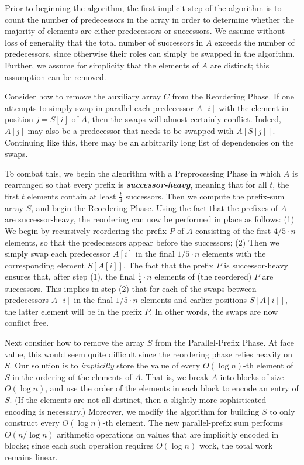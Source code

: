 \documentclass[sigconf, 10pt, nonacm]{acmart}
\newcommand{\defn}[1]{{\textit{\textbf{\boldmath #1}}}}
\renewcommand{\paragraph}[1]{\vspace{0.09in}\noindent{\bf \boldmath #1.}}
\theoremstyle{remark}
\theoremstyle{remark}
\begin{document}
\paragraph{Algorithm Outline}
Prior to beginning the algorithm, the first implicit step of the
algorithm is to count the number of predecessors in the array in
order to determine whether the majority of elements are either
predecessors or successors. We assume without loss of generality that the total
number of successors in $A$ exceeds the number of predecessors, since otherwise
their roles can simply be swapped in the algorithm. Further, we assume for
simplicity that the elements of $A$ are distinct; this assumption can be removed.

Consider how to remove the auxiliary array $C$ from the Reordering
Phase. If one attempts to simply swap in parallel each predecessor
$A[i]$ with the element in position $j = S[i]$ of $A$, then the swaps
will almost certainly conflict. Indeed, $A[j]$ may also be a
predecessor that needs to be swapped with $A[S[j]]$. Continuing like
this, there may be an arbitrarily long list of dependencies on the
swaps.

To combat this, we begin the algorithm with a Preprocessing Phase in
which $A$ is rearranged so that every prefix is
\defn{successor-heavy}, meaning that for all $t$, the first $t$
elements contain at least $\frac{t}{4}$ successors. Then we compute
the prefix-sum array $S$, and begin the Reordering Phase. Using the
fact that the prefixes of $A$ are successor-heavy, the reordering can
now be performed in place as follows: (1) We begin by recursively
reordering the prefix $P$ of $A$ consisting of the first $4/5 \cdot n$
elements, so that the predecessors appear before the successors; (2)
Then we simply swap each predecessor $A[i]$ in the final $1/5 \cdot n$
elements with the corresponding element $S[A[i]]$. The fact that the
prefix $P$ is successor-heavy ensures that, after step (1), the final 
$\frac{1}{5} \cdot n$ elements of (the reordered) $P$ are successors. 
This implies in step (2) that for each of the swaps between predecessors $A[i]$
in the final $1/5 \cdot n$ elements and earlier positions $S[A[i]]$, the latter
element will be in the prefix $P$. In other words, the swaps are now conflict
free.

Next consider how to remove the array $S$ from the Parallel-Prefix
Phase. At face value, this would seem quite difficult since the
reordering phase relies heavily on $S$. Our solution is to
\emph{implicitly} store the value of every $O(\log n)$-th element of
$S$ in the ordering of the elements of $A$. That is, we break $A$ into
blocks of size $O(\log n)$, and use the order of the elements in each
block to encode an entry of $S$. (If the elements are not all
  distinct, then a slightly more sophisticated encoding is necessary.)
Moreover, we modify the algorithm for building $S$ to only construct
every $O(\log n)$-th element. The new parallel-prefix sum performs
$O(n / \log n)$ arithmetic operations on values that are implicitly
encoded in blocks; since each such operation requires $O(\log n)$
work, the total work remains linear.
\end{document}
